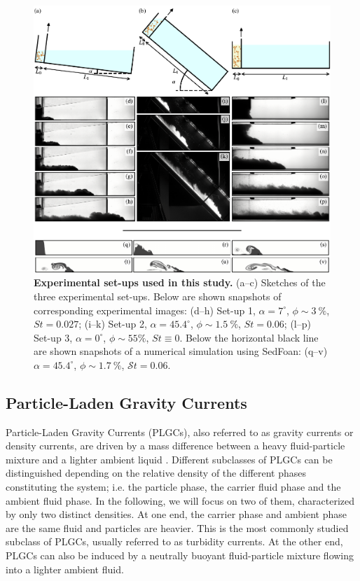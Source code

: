 \documentclass[12pt]{article}
\begin{document}
\begin{figure}[ht!]
	\centering
	\includegraphics{figure1.pdf}
	\caption{\textbf{Experimental set-ups used in this study.} (a--c) Sketches of the three experimental set-ups. Below are shown snapshots of corresponding experimental images: (d--h) Set-up 1, $\alpha = 7^\circ$, $\phi \sim 3~\%$, ${S}t=0.027$; (i--k) Set-up 2, $\alpha = 45.4^\circ$, $\phi \sim 1.5~\%$, ${S}t=0.06 $; (l--p) Set-up 3, $\alpha = 0^\circ$, $\phi \sim 55\%$, ${S}t \equiv 0$. Below the horizontal black line are shown snapshots of a numerical simulation using SedFoan: (q--v) $\alpha = 45.4^\circ$, $\phi \sim 1.7~\%$, $\mathcal{S}t=0.06$.}
	\label{fig:fig1}
\end{figure}


\subsection{Particle-Laden Gravity Currents}
\label{sec:intro_PLGC}

Particle-Laden Gravity Currents (PLGCs), also referred to as gravity currents or density currents, are driven by a mass difference between a heavy fluid-particle mixture and a lighter ambient liquid \citep[e.g.][]{Hopfinger1983, Middleton1993,Kneller2000, Meiburg2010,wells2021}. Different subclasses of PLGCs can be distinguished depending on the relative density of the different phases constituting the system; i.e. the particle phase, the carrier fluid phase and the ambient fluid phase. In the following, we will focus on two of them, characterized by only two distinct densities. At one end, the carrier phase and ambient phase are the same fluid and particles are heavier. This is the most commonly studied subclass of PLGCs, usually referred to as turbidity currents. At the other end, PLGCs can also be induced by a neutrally buoyant fluid-particle mixture flowing into a lighter ambient fluid.
\end{document}

